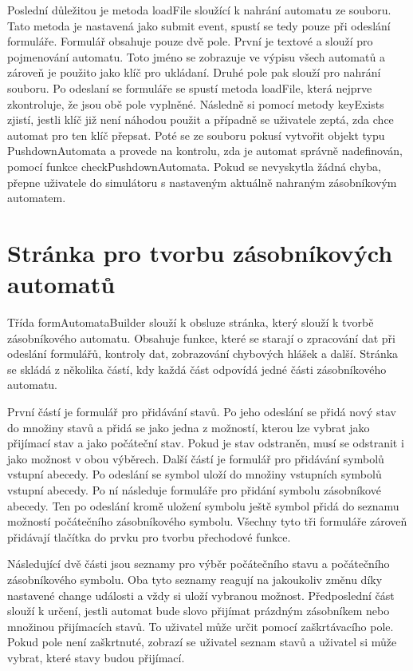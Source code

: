 Poslední důležitou je metoda loadFile sloužící k nahrání automatu ze souboru. Tato metoda je nastavená jako submit event, spustí se tedy pouze při odeslání formuláře. Formulář obsahuje pouze dvě pole. První je textové a slouží pro pojmenování automatu. Toto jméno se zobrazuje ve výpisu všech automatů a zároveň je použito jako klíč pro ukládaní. Druhé pole pak slouží pro nahrání souboru. Po odeslaní se formuláře se spustí metoda loadFile, která nejprve zkontroluje, že jsou obě pole vyplněné. Následně si pomocí metody keyExists zjistí, jestli klíč již není náhodou použit a případně se uživatele zeptá, zda chce automat pro ten klíč přepsat. Poté se ze souboru pokusí vytvořit objekt typu PushdownAutomata a provede na kontrolu, zda je automat správně nadefinován, pomocí funkce checkPushdownAutomata. Pokud se nevyskytla žádná chyba, přepne uživatele do simulátoru s nastaveným aktuálně nahraným zásobníkovým automatem.

\section{Stránka pro tvorbu zásobníkových automatů}

Třída formAutomataBuilder slouží k obsluze stránka, který slouží k tvorbě zásobníkového automatu. Obsahuje funkce, které se starají o zpracování dat při odeslání formulářů, kontroly dat, zobrazování chybových hlášek a další. Stránka se skládá z několika částí, kdy každá část odpovídá jedné části zásobníkového automatu. 

První částí je formulář pro přidávání stavů. Po jeho odeslání se přidá nový stav do množiny stavů a přidá se jako jedna z možností, kterou lze vybrat jako přijímací stav a jako počáteční stav. Pokud je stav odstraněn, musí se odstranit i jako možnost v obou výběrech. Další částí je formulář pro přidávání symbolů vstupní abecedy. Po odeslání se symbol uloží do množiny vstupních symbolů vstupní abecedy. Po ní následuje formuláře pro přidání symbolu zásobníkové abecedy. Ten po odeslání kromě uložení symbolu ještě symbol přidá do seznamu možností počátečního zásobníkového symbolu. Všechny tyto tři formuláře zároveň přidávají tlačítka do prvku pro tvorbu přechodové funkce. 

Následující dvě části jsou seznamy pro výběr počátečního stavu a počátečního zásobníkového symbolu. Oba tyto seznamy reagují na jakoukoliv změnu díky nastavené change události a vždy si uloží vybranou možnost. Předposlední část slouží k určení, jestli automat bude slovo přijímat prázdným zásobníkem nebo množinou přijímacích stavů. To uživatel může určit pomocí zaškrtávacího pole. Pokud pole není zaškrtnuté, zobrazí se uživatel seznam stavů a uživatel si může vybrat, které stavy budou přijímací.

